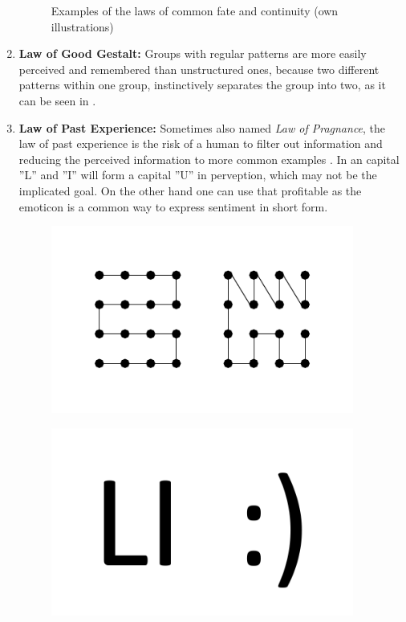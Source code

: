 \begin{enumerate}
\begin{figure}[H]
\begin{minipage}[b]{.5\linewidth}
            \label{fig:con}
        \end{minipage}
        \caption[Laws of Common Fate and Continuity]{Examples of the laws of common fate and continuity (own illustrations)}\label{fig:law3}
    \end{figure}
    \item \textbf{Law of Good Gestalt:} Groups with regular patterns are more easily perceived and remembered than unstructured ones, because two different patterns within one group, instinctively separates the group into two, as it can be seen in  \parencite{Todorovic.2008}.
    \item \textbf{Law of Past Experience:} Sometimes also named \textit{Law of Pragnance}, the law of past experience is the risk of a human to filter out information and reducing the perceived information to more common examples \parencite{Stevenson.n.y.}. In  an capital ''L'' and ''I'' will form a capital ''U'' in perveption, which may not be the implicated goal. On the other hand one can use that profitable as the emoticon is a common way to express sentiment in short form.
    \begin{figure}[H] 
        \begin{minipage}[b]{.5\linewidth}
            \centering\includegraphics[width=0.94\textwidth]{img/gestalt.pdf}
            \label{fig:gest}
        \end{minipage}%
        \begin{minipage}[b]{.5\linewidth}
            \centering\includegraphics[width=0.94\textwidth]{img/experience.pdf}

\end{minipage}
\end{figure}
\end{enumerate}
